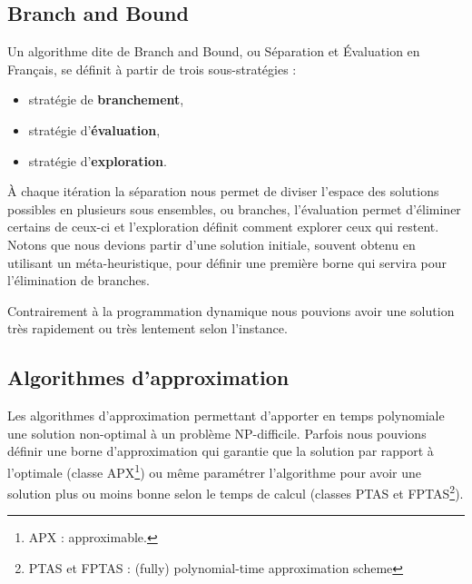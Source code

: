 \subsection{Branch and Bound}
Un algorithme dite de Branch and Bound, ou Séparation et Évaluation en Français, se définit à partir de trois sous-stratégies :

\begin{itemize}
\item stratégie de \textbf{branchement},
\item stratégie d'\textbf{évaluation},
\item stratégie d'\textbf{exploration}.
\end{itemize}

À chaque itération la séparation nous permet de diviser l'espace des solutions possibles en plusieurs sous ensembles, ou branches, l'évaluation permet d'éliminer certains de ceux-ci et l'exploration définit comment explorer ceux qui restent. Notons que nous devions partir d'une solution initiale, souvent obtenu en utilisant un méta-heuristique, pour définir une première borne qui servira pour l'élimination de branches. 

Contrairement à la programmation dynamique nous pouvions avoir une solution très rapidement ou très lentement selon l'instance. 

\subsection{Algorithmes d'approximation}
Les algorithmes d'approximation permettant d'apporter en temps polynomiale une
solution non-optimal à un problème NP-difficile. Parfois nous pouvions définir une borne d'approximation qui garantie que la solution par rapport à l'optimale (classe APX\footnote{APX : approximable. }) ou même paramétrer l'algorithme pour avoir une solution plus ou moins bonne selon le temps de calcul (classes PTAS et FPTAS\footnote{ PTAS et FPTAS : (fully) polynomial-time approximation scheme}).  
